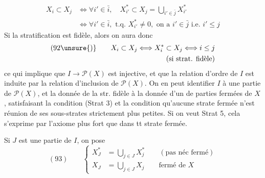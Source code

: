 
\[
\begin{aligned}
X_i\subset X_j&\Longleftrightarrow\forall i'\in\bar i,\quad X_{i'}^*\subset X_j=\bigcup_{i'\in\bar j}X_{i'}^*\\
&\Longleftrightarrow\forall i'\in\bar i,\text{ t.q. }X_{i'}^*\neq0,\text{ on a }i'\in\bar j\text{ i.e. }i'\leq j
\end{aligned}
\]
Si la stratification est fidèle, alors on aura donc
\[
\begin{aligned}
(92\unsure{)}\qquad X_i\subset X_j\Longleftrightarrow X_i^*\subset X_j\Longleftrightarrow i\leq j&\\
(\text{si strat. fidèle})&
\end{aligned}
\]
ce qui implique que $I\longrightarrow\mathcal P(X)$ est injective, et que la relation d'ordre de $I$ est induite par la relation d'inclusion de $\mathcal P(X)$. On en peut identifier $I$ à une partie de $\mathcal P(X)$, et la donnée de la str. fidèle à la donnée d'un   de parties fermées  de $X$,  satisfaisant la condition (Strat 3)  et la condition qu'aucune strate fermée n'est réunion de ses sous-strates strictement plus petites. Si on veut Strat 5, cela s'exprime par l'axiome plus fort que dans tt strate fermée.

Si $J$ est une partie de $I$, on pose
\[
(93)\qquad\left\{
\begin{aligned}
X_J^*&=\bigcup_{j\in J}X_j^*\qquad(\text{pas néc fermé})\\
X_J&=\bigcup_{j\in J}X_j\qquad\text{fermé de }X
\end{aligned}\right.
\]


